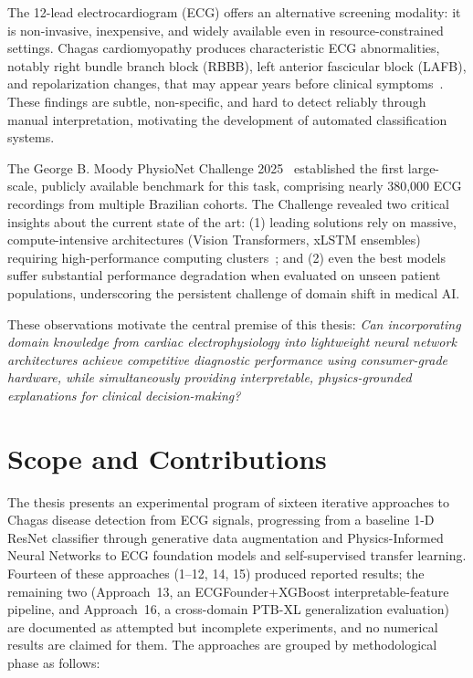 The 12-lead electrocardiogram (ECG) offers an alternative screening modality: it is non-invasive, inexpensive, and widely available even in resource-constrained settings. Chagas cardiomyopathy produces characteristic ECG abnormalities, notably right bundle branch block (RBBB), left anterior fascicular block (LAFB), and repolarization changes, that may appear years before clinical symptoms~\cite{nunes2018chagas}. These findings are subtle, non-specific, and hard to detect reliably through manual interpretation, motivating the development of automated classification systems.

The George B. Moody PhysioNet Challenge 2025~\cite{reyna2024detection} established the first large-scale, publicly available benchmark for this task, comprising nearly 380,000 ECG recordings from multiple Brazilian cohorts. The Challenge revealed two critical insights about the current state of the art: (1) leading solutions rely on massive, compute-intensive architectures (Vision Transformers, xLSTM ensembles) requiring high-performance computing clusters~\cite{santvliet2025detecting, nicolson2025transformer}; and (2) even the best models suffer substantial performance degradation when evaluated on unseen patient populations, underscoring the persistent challenge of domain shift in medical AI.

These observations motivate the central premise of this thesis: \textit{Can incorporating domain knowledge from cardiac electrophysiology into lightweight neural network architectures achieve competitive diagnostic performance using consumer-grade hardware, while simultaneously providing interpretable, physics-grounded explanations for clinical decision-making?}

\section{Scope and Contributions}

The thesis presents an experimental program of sixteen iterative approaches to Chagas disease detection from ECG signals, progressing from a baseline 1-D ResNet classifier through generative data augmentation and Physics-Informed Neural Networks to ECG foundation models and self-supervised transfer learning. Fourteen of these approaches (1--12, 14, 15) produced reported results; the remaining two (Approach~13, an ECGFounder+XGBoost interpretable-feature pipeline, and Approach~16, a cross-domain PTB-XL generalization evaluation) are documented as attempted but incomplete experiments, and no numerical results are claimed for them. The approaches are grouped by methodological phase as follows:

